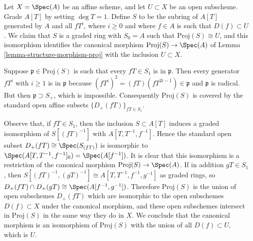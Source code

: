 \begin{example}
\label{example-open-subset-proj}
Let $X = \Spec(A)$ be an affine scheme, and let $U \subset X$
be an open subscheme.  Grade $A[T]$ by setting $\deg T = 1$.  Define $S$
to be the subring of $A[T]$ generated by $A$ and all $fT^i$, where $i \ge 0$
and where $f \in A$ is such that $D(f) \subset U$.  We claim that $S$
is a graded ring with $S_0 = A$ such that $\text{Proj}(S) \cong U$,
and this isomorphism identifies the canonical morphism
$\text{Proj}(S) \to \Spec(A)$ of Lemma \ref{lemma-structure-morphism-proj}
with the inclusion $U \subset X$.

\medskip\noindent
Suppose $\mathfrak p \in \text{Proj}(S)$ is such that every $fT \in S_1$
is in $\mathfrak p$.  Then every generator $fT^i$ with $i \ge 1$
is in $\mathfrak p$ because $(fT^i)^2 = (fT)(fT^{2i-1}) \in \mathfrak p$
and $\mathfrak p$ is radical.  But then $\mathfrak p \supset S_+$, which
is impossible. Consequently $\text{Proj}(S)$ is covered by the standard
open affine subsets $\{D_+(fT)\}_{fT \in S_1}$.

\medskip\noindent
Observe that, if $fT \in S_1$, then the inclusion $S \subset A[T]$
induces a graded isomorphism of $S[(fT)^{-1}]$ with $A[T, T^{-1}, f^{-1}]$.
Hence the standard open subset $D_+(fT) \cong \Spec(S_{(fT)})$
is isomorphic to $\Spec(A[T, T^{-1}, f^{-1}]_0) = \Spec(A[f^{-1}])$.
It is clear that this isomorphism is a restriction of the canonical morphism
$\text{Proj}(S) \to \Spec(A)$.  If in addition $gT \in S_1$, then
$S[(fT)^{-1}, (gT)^{-1}] \cong A[T, T^{-1}, f^{-1}, g^{-1}]$
as graded rings, so $D_+(fT) \cap D_+(gT) \cong \Spec(A[f^{-1}, g^{-1}])$.
Therefore $\text{Proj}(S)$ is the union of open subschemes $D_+(fT)$
which are isomorphic to the open subschemes $D(f) \subset X$
under the canonical morphism, and these open subschemes intersect
in $\text{Proj}(S)$ in the same way they do in $X$.
We conclude that the canonical morphism is an isomorphism of
$\text{Proj}(S)$ with the union of all $D(f) \subset U$, which is $U$.
\end{example}






















